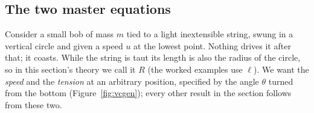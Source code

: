 \subsection{The two master equations}
Consider a small bob of mass $m$ tied to a light inextensible string, swung in a vertical circle and
given a speed $u$ at the lowest point. Nothing drives it after that; it coasts. While the string is taut
its length is also the radius of the circle, so in this section's theory we call it $R$ (the worked
examples use $\ell$). We want the \emph{speed} and the \emph{tension} at an arbitrary position,
specified by the angle $\theta$ turned from the bottom (Figure~\ref{fig:vcgen}); every other result in the section follows from
these two.

\begin{figure}[htbp]
\centering
{}
\end{figure}

